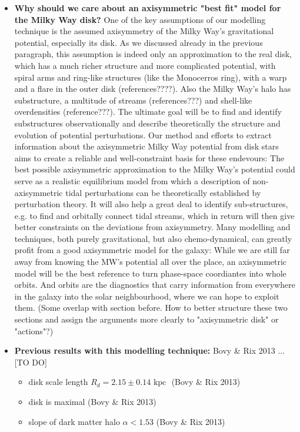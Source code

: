 \documentclass[12pt,preprint]{aastex}
\begin{document}
\begin{itemize}
[TO DO] (Maybe cite Potzen 2015, who showed that analysing aspherical systems in spherical actions can still be a powerful tool, when used with care...)

\item \textbf{Why should we care about an axisymmetric "best fit" model for the Milky Way disk?} One of the key assumptions of our modelling technique is the assumed axisymmetry of the Milky Way's gravitational potential, especially its disk. As we discussed already in the previous paragraph, this assumption is indeed only an approximation to the real disk, which has a much richer structure and more complicated potential, with spiral arms and ring-like structures (like the Monocerros ring), with a warp and a flare in the outer disk (references????). Also the Milky Way's halo has substructure, a multitude of streams (references???) and shell-like overdensities (reference???). The ultimate goal will be to find and identify substructures observationally and describe theoretically the structure and evolution of potential perturbations. Our method and efforts  to extract information about the axisymmetric Milky Way potential from disk stars aims to create a reliable and well-constraint basis for these endevours: The best possible axisymmetric approximation to the Milky Way's potential could serve as a realistic equilibrium model from which a description of non-axisymmetric tidal perturbations can be theoretically established by perturbation theory. It will also help a great deal to identify sub-structures, e.g. to find and orbitally connect tidal streams, which in return will then give better constraints on the deviations from axisymmetry. Many modelling and techniques, both purely gravitational, but also chemo-dynamical, can greatly profit from a good axisymmetric model for the galaxy: While we are still far away from knowing the MW's potential all over the place, an axisymmetric model will be the best reference to turn phase-space coordiantes into whole orbits. And orbits are the diagnostics that carry information from everywhere in the galaxy into the solar neighbourhood, where we can hope to exploit them. (Some overlap with section before. How to better structure these two sections and assign the arguments more clearly to "axisymmetric disk" or "actions"?) 

\item \textbf{Previous results with this modelling technique:} Bovy \& Rix 2013 ... [TO DO]
\begin{itemize}
\item disk scale length $R_d = 2.15 \pm 0.14 \text{ kpc }$ (Bovy \& Rix 2013)
\item disk is maximal (Bovy \& Rix 2013)
\item slope of dark matter halo $\alpha < 1.53$ (Bovy \& Rix 2013)
\end{itemize}


\end{itemize}
\end{document}

